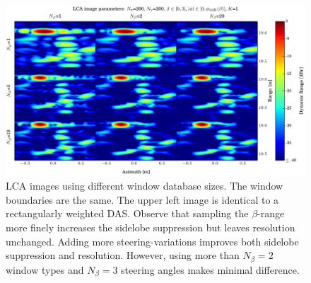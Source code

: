 \documentclass[10pt,journal,draftclsnofoot,onecolumn]{IEEEtran}
\let\MYoriglatexcaption\caption               %
\renewcommand{\caption}[2][\relax]{\MYoriglatexcaption[#2]{#2}}
\newcommand\1{\vec 1}
\begin{document}
\begin{figure}[t]%
\includegraphics[width=\textwidth]{gfx/oversampling_mosaic.pdf}%
\caption{LCA images using different window database sizes. The window boundaries are the same. The upper left image is identical to a rectangularly weighted DAS. Observe that sampling the $\beta$-range more finely increases the sidelobe suppression but leaves resolution unchanged. Adding more steering-variations improves both sidelobe suppression and resolution. However, using more than  $N_\beta=2$ window types and $N_\beta=3$ steering angles makes minimal difference.}\label{oversampling_mosaic}
\end{figure}
\end{document}
